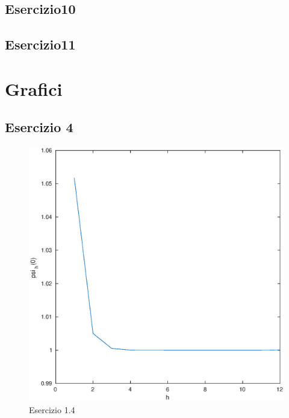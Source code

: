 \documentclass[11pt]{extarticle}
\begin{document}
\subsection{Esercizio10}

\subsection{Esercizio11}

\newpage
{}
\section{\textbf{Grafici}}
\subsection{Esercizio 4}
\begin{figure}[h]
\caption{Esercizio 1.4}
\label{fes1.4}
\includegraphics[width=\textwidth]{plot/fes4.eps}
\end{figure}
\end{document}
